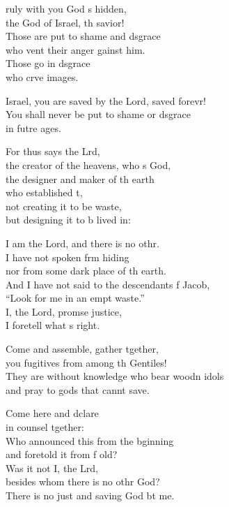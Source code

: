 \settowidth{\versewidth}{In the Lord shall be the vindication and the glory *}
\begin{psalmverse}%
  \begin{patverse}
    ruly with you God \pointup{\i}s hidden,\Med\\
the God of Israel, th savior!\\
Those are put to shame and d\pointup{\i}sgrace\Med\\
who vent their anger gainst him.\\
Those go in d\pointup{\i}sgrace\Med\\
who crve images.

Israel, you are saved by the Lord, saved forevr!\Flex\\
You shall never be put to shame or d\pointup{\i}sgrace\Med\\
in futre ages.

For thus says the Lrd,\Flex\\
the creator of the heavens, who \pointup{\i}s God,\Med\\
the designer and maker of th earth\\
who established \pointup{\i}t,\Flex\\
not creating it to be  waste,\Med\\
but designing it to b lived in:

I am the Lord, and there is no othr.\Flex\\
I have not spoken frm hiding\Med\\
nor from some dark place of th earth.\\
And I have not said to the descendants f Jacob,\Med\\
“Look for me in an empt waste.”\\
I, the Lord, prom\pointup{\i}se justice,\Med\\
I foretell what \pointup{\i}s right.

Come and assemble, gather tgether,\Med\\
you fugitives from among th Gentiles!\\
They are without knowledge who bear woodn idols\Med\\
and pray to gods that cannt save.

Come here and dclare\Med\\
in counsel tgether:\\
Who announced this from the bginning\Med\\
and foretold it from f old?\\
Was it not I, the Lrd,\Flex\\
besides whom there is no othr God?\Med\\
There is no just and saving God bt me.


\end{patverse}
\end{psalmverse}
